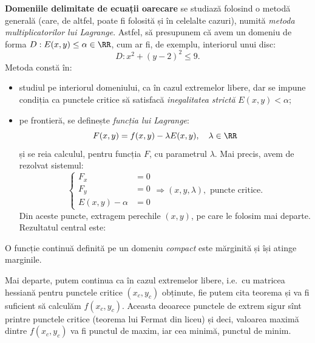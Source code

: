 \textbf{Domeniile delimitate de ecuații oarecare} se studiază folosind o metodă
generală (care, de altfel, poate fi folosită și în celelalte cazuri), numită
\emph{metoda multiplicatorilor lui Lagrange}. Astfel, să presupunem că
avem un domeniu de forma $ D : E(x, y) \leq \alpha \in \RR$, cum ar fi, de exemplu,
interiorul unui disc:
\[
    D : x^2 + (y - 2)^2 \leq 9.
\]
Metoda constă în:
\begin{itemize}
    \item studiul pe interiorul domeniului, ca în cazul extremelor libere,
        dar se impune condiția ca punctele critice să satisfacă
        \emph{inegalitatea strictă} $ E(x, y) < \alpha $;
    \item pe frontieră, se definește \emph{funcția lui Lagrange}:
        \[
            F(x, y) = f(x, y) - \lambda E(x, y), \quad \lambda \in \RR
        \]
        și se reia calculul, pentru funcția $ F $, cu parametrul $ \lambda $. Mai precis,
        avem de rezolvat sistemul:
        \[
            \begin{cases}
                F_x &= 0 \\
                F_y &= 0 \\
                E(x, y) - \alpha &= 0
            \end{cases} \Longrightarrow (x, y, \lambda), \text{ puncte critice.}
        \]
        Din aceste puncte, extragem perechile $ (x, y) $, pe care le folosim
        mai departe. Rezultatul central este:
\end{itemize}

\begin{theorem}\label{thm:functie-marg}
    O funcție continuă definită pe un domeniu \emph{compact}\footnotemark
    este mărginită și își atinge mar\-gi\-ni\-le.
\end{theorem}


Mai departe, putem continua ca în cazul extremelor libere, i.e.\ cu matricea hessiană
pentru punctele critice $ (x_c, y_c) $ obținute, fie putem cita teorema și va fi
suficient să calculăm $ f(x_c, y_c) $. Aceasta deoarece punctele de extrem
sigur sînt printre punctele critice (teorema lui Fermat din liceu) și deci,
valoarea maximă dintre $ f(x_c, y_c) $ va fi punctul de maxim, iar cea
minimă, punctul de minim.

